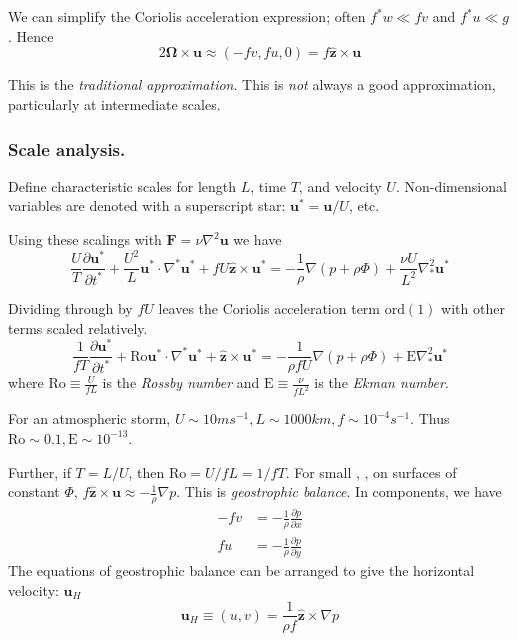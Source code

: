 \documentclass{jknotes}
\begin{document}
We can simplify the Coriolis acceleration expression; often $f^* w \ll f v$
and $f^* u \ll g$. Hence
\begin{equation}
	2 \symbf{\Omega} \times \symbf{u} \approx (-fv, fu, 0) = f \hat{\symbf{z}} \times
	\symbf{u}
\end{equation}

This is the \emph{traditional approximation}. This is \emph{not} always a good
approximation, particularly at intermediate scales.

\subsubsection{Scale analysis.}
Define characteristic scales for length $L$, time $T$, and velocity $U$.
Non-dimensional variables are denoted with a superscript star: $\symbf{u}^* =
\symbf{u}/U$, etc.

Using these scalings with $\symbf{F} = \nu \nabla^2 \symbf{u}$ we have
\begin{equation}
	\frac{U}{T} \frac{\partial \symbf{u}^*}{\partial t^*} + \frac{U^2}{L}
	\symbf{u}^* \cdot \nabla^* \symbf{u}^* + fU \hat{\symbf{z}} \times \symbf{u}^* =
	-\frac{1}{\rho} \nabla \left(p + \rho \Phi\right) + \frac{\nu U}{L^2} \nabla_*^2
		\symbf{u}^*
\end{equation}

Dividing through by $fU$ leaves the Coriolis acceleration term $\text{ord}(1)$ with
other terms scaled relatively.
\begin{equation}
	\frac{1}{fT} \frac{\partial \symbf{u}^*}{\partial t^*} + \text{Ro}	\symbf{u}^*
	\cdot \nabla^* \symbf{u}^* + \hat{\symbf{z}} \times \symbf{u}^* =
	-\frac{1}{\rho f U} \nabla \left(p + \rho \Phi\right) + \text{E} \nabla_*^2
		\symbf{u}^*
\end{equation}
where $\text{Ro} \equiv \frac{U}{fL}$ is the \emph{Rossby number} and
$\text{E} \equiv \frac{\nu}{fL^2}$ is the \emph{Ekman number}.

\begin{eg}
	For an atmospheric storm, $U \sim 10 m s^{-1}, L \sim 1000 km, f \sim
	10^{-4} s^{-1}$. Thus $\text{Ro} \sim 0.1, \text{E} \sim 10^{-13}$.
\end{eg}

Further, if $T = L/U$, then $\text{Ro} = U/fL = 1/fT$. For small \Ro, \Ek, 
on surfaces of constant $\Phi$, $f \hat{\symbf{z}} \times \symbf{u} \approx
-\frac{1}{\rho}\nabla p$.  This is \emph{geostrophic balance}. In components,
we have
\begin{equation}
	\begin{aligned}
		-fv &= -\frac{1}{\rho}\frac{\partial p}{\partial x} \\
		fu &= -\frac{1}{\rho}\frac{\partial p}{\partial y}
	\end{aligned}
\end{equation}
The equations of geostrophic balance can be arranged to give the horizontal
velocity:
$\symbf{u}_H$
\begin{equation}
	\symbf{u}_H \equiv (u,v) = \frac{1}{\rho f} \hat{\symbf{z}} \times \nabla p
\end{equation}
\end{document}
